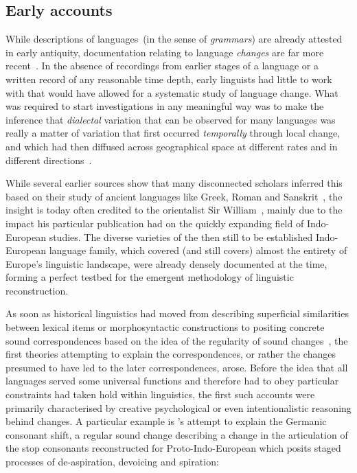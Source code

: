 \subsection{Early accounts}

While descriptions of languages~(in the sense of \emph{grammars}) are already attested in early antiquity, documentation relating to language \emph{changes} are far more recent~\citep[see][ch.I]{Jespersen1922}. In the absence of recordings from earlier stages of a language or a written record of any reasonable time depth, early linguists had little to work with that would have allowed for a systematic study of language change. %
What was required to start investigations in any meaningful way was to make the inference that \emph{dialectal} variation that can be observed for many languages was really a matter of variation that first occurred \emph{temporally} through local change, and which had then diffused across geographical space at different rates and in different directions~\citep{Chambers1998}.

While several earlier sources show that many disconnected scholars inferred this based on their study of ancient languages like Greek, Roman and Sanskrit~\citep[ch.II]{Jespersen1922},
the insight is today often credited to the orientalist Sir William~\citet{Jones1799}, mainly due to the impact his particular publication had on the quickly expanding field of Indo-European studies. The diverse varieties of the then still to be established Indo-European language family, which covered (and still covers) almost the entirety of Europe's linguistic landscape, were already densely documented at the time, forming a perfect testbed for the emergent methodology of linguistic reconstruction.

As soon as historical linguistics had moved from describing superficial similarities between lexical items or morphosyntactic constructions to positing concrete sound correspondences based on the idea of the regularity of sound changes~\citep{Paul1880}, the first theories attempting to explain the correspondences, or rather the changes presumed to have led to the later correspondences, arose. Before the idea that all languages served some universal functions and therefore had to obey particular constraints had taken hold within linguistics, the first such accounts were primarily characterised by creative psychological or even intentionalistic reasoning behind changes.
A particular example is \citet{Grimm1848}'s attempt to explain the Germanic consonant shift, a regular sound change describing a change in the articulation of the stop consonants reconstructed for Proto-Indo-European which posits staged processes of de-aspiration, devoicing and spiration:

